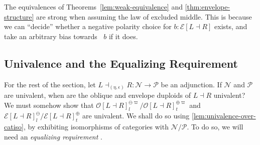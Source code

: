 \documentclass[runningheads]{llncs}
\newcommand*\rocqlogo{\usebox{\rocqlogobox}}
\newcommand{\lemmaref}[3]{\href{https://github.com/UniMath/UniMath/blob/94fae0eda57a778cec704bfa73b4ff525c9bc475/#1\#L#2?name=#3}{\rocqlogo}}
\newcommand{\acat}[1]{\mathcal{#1}}
\newcommand{\PP}{\acat{P}}
\newcommand{\NN}{\acat{N}}
\newcommand{\OO}{\acat{O}}
\newcommand{\EE}{\acat{E}}
\newcommand{\Cl}[1]{#1_l}
\newcommand{\Ct}[1]{#1_t}
\newcommand{\Cn}[1]{#1^\ominus}
\newcommand{\Cp}[1]{#1^\oplus}
\newcommand{\Csn}[2]{#1^{\ominus#2}}
\newcommand{\Csp}[2]{#1^{\oplus#2}}
\newcommand{\Cnl}[1]{\Cn{\Cl{#1}}}
\newcommand{\Cpt}[1]{\Cp{\Ct{#1}}}
\newcommand{\Csnl}[2]{\Csn{\Cl{#1}}{#2}}
\newcommand{\Cspt}[2]{\Csp{\Ct{#1}}{#2}}
\newcommand{\Obl}[1]{\OO[#1]}
\newcommand{\Env}[1]{\EE[#1]}
\newcommand{\projneg}{\mathop{\pi^{\ominus}}}
\begin{document}
\begin{remark}[{\lemmaref{UniMath/CategoryTheory/Nonassociative/Duploids/FromAdjunction/StructureTheorem.v}{351}{is\_strong\_equiv\_duploid\_into\_envelope\_from\_LEM}, \lemmaref{UniMath/CategoryTheory/Nonassociative/Duploids/FromAdjunction/Oblique.v}{307}{split\_eso\_oblique\_to\_envelope\_from\_LEM}}]
The equivalences of Theorems~\ref{lem:weak-equivalence} and
\ref{thm:envelope-structure} are strong when assuming the law of
excluded middle. This is because we can ``decide'' whether a negative
polarity choice for \(b : \Env{L \dashv R}\) exists, and take an
arbitrary bias towards \(\projneg{b}\) if it does.
\end{remark}
\subsection{Univalence and the Equalizing Requirement}
\label{sec:equalizing}
For the rest of the section, let \(L \dashv_{(\eta, \epsilon)} R : \NN \to \PP\) be an
adjunction. If \(\NN\) and \(\PP\) are univalent, when are the oblique
and envelope duploids of \(L \dashv R\) univalent? We must somehow
show that \(\Csnl{\Obl{L \dashv R}}\varpi/\Cspt{\Obl{L \dashv
R}}\varpi\) and \(\Cnl{\Env{L \dashv R}}/\Cpt{\Env{L \dashv R}}\) are
univalent. We shall do so using \autoref{lem:univalence-over-catiso}, by
exhibiting isomorphisms of categories with \(\NN/\PP\). To do so, we
will need an \emph{equalizing requirement} \cite{MunchMaccagnoni14,Moggi91}.
\end{document}

